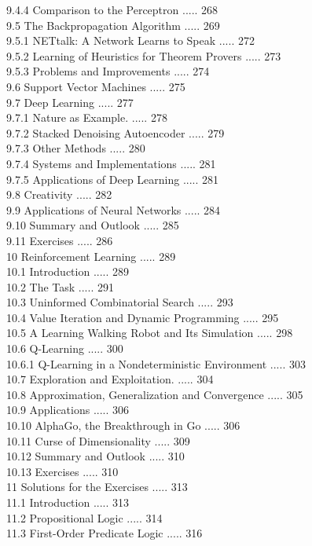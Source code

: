 \documentclass[10pt]{article}
\begin{document}
9.4.4 Comparison to the Perceptron ..... 268\\
9.5 The Backpropagation Algorithm ..... 269\\
9.5.1 NETtalk: A Network Learns to Speak ..... 272\\
9.5.2 Learning of Heuristics for Theorem Provers ..... 273\\
9.5.3 Problems and Improvements ..... 274\\
9.6 Support Vector Machines ..... 275\\
9.7 Deep Learning ..... 277\\
9.7.1 Nature as Example. ..... 278\\
9.7.2 Stacked Denoising Autoencoder ..... 279\\
9.7.3 Other Methods ..... 280\\
9.7.4 Systems and Implementations ..... 281\\
9.7.5 Applications of Deep Learning ..... 281\\
9.8 Creativity ..... 282\\
9.9 Applications of Neural Networks ..... 284\\
9.10 Summary and Outlook ..... 285\\
9.11 Exercises ..... 286\\
10 Reinforcement Learning ..... 289\\
10.1 Introduction ..... 289\\
10.2 The Task ..... 291\\
10.3 Uninformed Combinatorial Search ..... 293\\
10.4 Value Iteration and Dynamic Programming ..... 295\\
10.5 A Learning Walking Robot and Its Simulation ..... 298\\
10.6 Q-Learning ..... 300\\
10.6.1 Q-Learning in a Nondeterministic Environment ..... 303\\
10.7 Exploration and Exploitation. ..... 304\\
10.8 Approximation, Generalization and Convergence ..... 305\\
10.9 Applications ..... 306\\
10.10 AlphaGo, the Breakthrough in Go ..... 306\\
10.11 Curse of Dimensionality ..... 309\\
10.12 Summary and Outlook ..... 310\\
10.13 Exercises ..... 310\\
11 Solutions for the Exercises ..... 313\\
11.1 Introduction ..... 313\\
11.2 Propositional Logic ..... 314\\
11.3 First-Order Predicate Logic ..... 316\\
\end{document}
